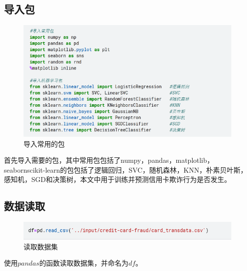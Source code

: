 \subsection{导入包}
		\begin{figure}[H]
			\centering
			\includegraphics[scale=0.6,angle=0]{images/2.png}
			\caption{导入常用的包}
			\label{2}
		\end{figure}
首先导入需要的包，其中常用包包括了numpy，pandas，matplotlib，seabornscikit-learn的包包括了逻辑回归，SVC，随机森林，KNN，朴素贝叶斯，感知机，SGD和决策树，本文中用于训练并预测信用卡欺诈行为是否发生。

\subsection{数据读取}
\begin{figure}[H]
	\centering
	\includegraphics[scale=1.0,angle=0]{images/3.png}
	\caption{读取数据集}
	\label{3}
\end{figure}
使用$pandas$的函数读取数据集，并命名为$df$。
		
